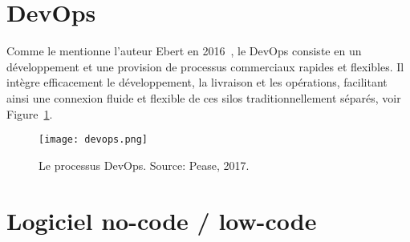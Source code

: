 




\section{DevOps}\label{devops_ref}

Comme le mentionne l'auteur Ebert en 2016~\cite{ebert2016devops}, le DevOps consiste en un développement et une provision de processus commerciaux rapides et flexibles. Il intègre efficacement le développement, la livraison et les opérations, facilitant ainsi une connexion fluide et flexible de ces silos traditionnellement séparés, voir Figure~\ref{fig:devops}.

\begin{figure}[htb]
\centering
\texttt{[image: devops.png]}
\caption{Le processus DevOps. Source: Pease, 2017.~\cite{devops_illustration}}
\label{fig:devops}
\end{figure}


\section{Logiciel no-code / low-code}


